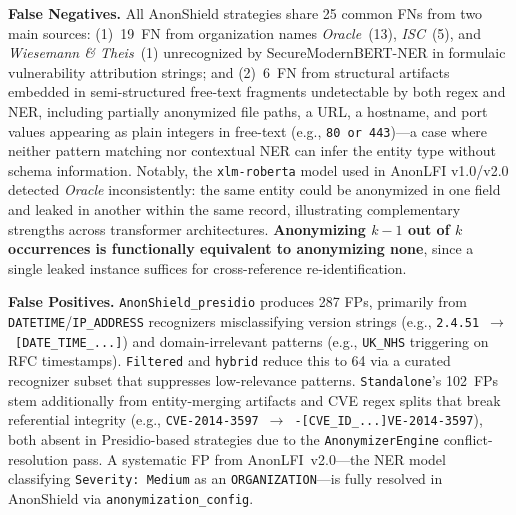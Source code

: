\documentclass[12pt]{article}
\begin{document}
\textbf{False Negatives.} All AnonShield strategies share 25 common FNs from two
main sources: (1)~19~FN from organization names \emph{Oracle}~(13),
\emph{ISC}~(5), and \emph{Wiesemann \& Theis}~(1) unrecognized by
SecureModernBERT-NER in formulaic vulnerability attribution strings; and
(2)~6~FN from structural artifacts embedded in semi-structured free-text
fragments undetectable by both regex and NER, including partially anonymized
file paths, a URL, a hostname, and port values appearing as plain integers
in free-text (e.g., \texttt{80 or 443})---a case where neither pattern
matching nor contextual NER can infer the entity type without schema
information. Notably, the \texttt{xlm-roberta} model used in AnonLFI v1.0/v2.0
detected \emph{Oracle} inconsistently: the same entity could be anonymized
in one field and leaked in another within the same record, illustrating
complementary strengths across transformer architectures. \textbf{Anonymizing
$k{-}1$ out of $k$ occurrences is functionally equivalent to anonymizing
none}, since a single leaked instance suffices for cross-reference
re-identification.

\textbf{False Positives.} \texttt{AnonShield\_presidio} produces 287 FPs,
primarily from \texttt{DATETIME}/\texttt{IP\_ADDRESS} recognizers
misclassifying version strings (e.g., \texttt{2.4.51}~$\to$~\texttt{[DATE\_TIME\_...]})
and domain-irrelevant patterns (e.g., \texttt{UK\_NHS} triggering on RFC timestamps).
\texttt{Filtered} and \texttt{hybrid} reduce this to 64 via a curated
recognizer subset that suppresses low-relevance patterns.
\texttt{Standalone}'s 102~FPs stem additionally from entity-merging artifacts
and CVE regex splits that break referential integrity
(e.g., \texttt{CVE-2014-3597}~$\to$~\texttt{-[CVE\_ID\_...]VE-2014-3597}),
both absent in Presidio-based strategies due to the \texttt{AnonymizerEngine}
conflict-resolution pass. A systematic FP from AnonLFI~v2.0---the NER model classifying
\texttt{Severity: Medium} as an \texttt{ORGANIZATION}---is fully resolved in AnonShield via \texttt{anonymization\_config}.



\end{document}
